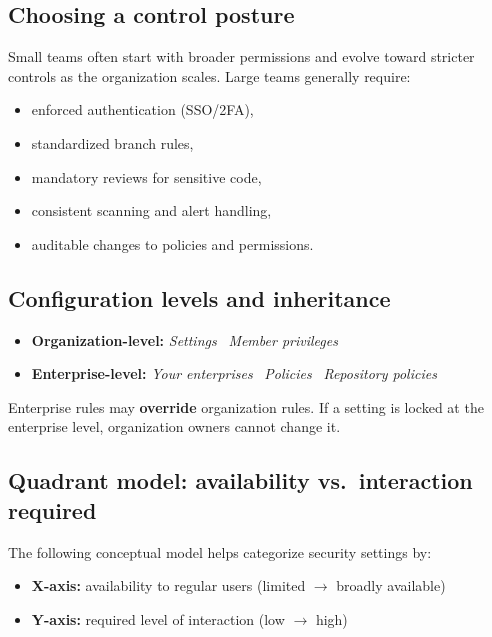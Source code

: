 \documentclass[11pt]{article}
\begin{document}
\subsection{Choosing a control posture}
Small teams often start with broader permissions and evolve toward stricter controls as the organization scales. Large teams generally require:

\begin{itemize}[leftmargin=*,itemsep=2pt]
  \item enforced authentication (SSO/2FA),
  \item standardized branch rules,
  \item mandatory reviews for sensitive code,
  \item consistent scanning and alert handling,
  \item auditable changes to policies and permissions.
\end{itemize}

\subsection{Configuration levels and inheritance}
\begin{itemize}[leftmargin=*,itemsep=2pt]
  \item \textbf{Organization-level:} \textit{Settings} \textrightarrow\ \textit{Member privileges}
  \item \textbf{Enterprise-level:} \textit{Your enterprises} \textrightarrow\ \textit{Policies} \textrightarrow\ \textit{Repository policies}
\end{itemize}

\begin{warningbox}
Enterprise rules may \textbf{override} organization rules. If a setting is locked at the enterprise level, organization owners cannot change it.
\end{warningbox}

\subsection{Quadrant model: availability vs.\ interaction required}
The following conceptual model helps categorize security settings by:
\begin{itemize}[leftmargin=*,itemsep=2pt]
  \item \textbf{X-axis:} availability to regular users (limited \(\rightarrow\) broadly available)
  \item \textbf{Y-axis:} required level of interaction (low \(\rightarrow\) high)
\end{itemize}
\end{document}
